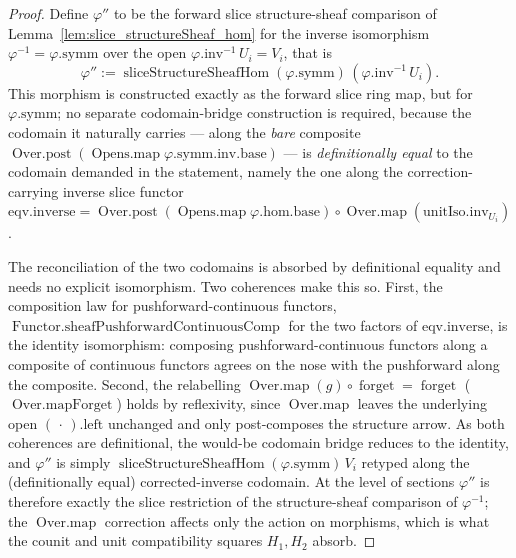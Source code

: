 \begin{proof}
  \leanok
  Define \(\varphi''\) to be the forward slice structure-sheaf comparison of
  Lemma~\ref{lem:slice_structureSheaf_hom} for the inverse isomorphism \(\varphi^{-1} = \varphi.
  \mathrm{symm}\) over the open \(\varphi.\mathrm{inv}^{-1}\,U_i = V_i\), that is
  \[
    \varphi'' := \operatorname{sliceStructureSheafHom}(\varphi.\mathrm{symm})\,(\varphi.\mathrm{inv}^{-1}\,U_i).
  \]
  This morphism is constructed exactly as the forward slice ring map, but for \(\varphi.\mathrm{symm}\);
  no separate codomain-bridge construction is required, because the codomain it naturally carries ---
  along the \emph{bare} composite \(\operatorname{Over.post}(\operatorname{Opens.map}\varphi.\mathrm{symm}.
  \mathrm{inv}.\mathrm{base})\) --- is \emph{definitionally equal} to the codomain demanded in the
  statement, namely the one along the correction-carrying inverse slice functor
  \(\mathrm{eqv}.\mathrm{inverse} = \operatorname{Over.post}(\operatorname{Opens.map}\varphi.\mathrm{hom}.
  \mathrm{base}) \circ \operatorname{Over.map}(\mathrm{unitIso}.\mathrm{inv}_{U_i})\).

  The reconciliation of the two codomains is absorbed by definitional equality and needs no explicit
  isomorphism. Two coherences make this so. First, the composition law for pushforward-continuous
  functors, \(\operatorname{Functor.sheafPushforwardContinuousComp}\) for the two factors of
  \(\mathrm{eqv}.\mathrm{inverse}\), is the identity isomorphism:
  composing pushforward-continuous functors along a composite of continuous functors agrees on the nose
  with the pushforward along the composite. Second, the relabelling
  \(\operatorname{Over.map}(g) \circ \operatorname{forget} = \operatorname{forget}\)
  (\(\operatorname{Over.mapForget}\)) holds by reflexivity, since \(\operatorname{Over.map}\) leaves
  the underlying open \((\,\cdot\,).\mathrm{left}\) unchanged and only post-composes the structure
  arrow. As both coherences are definitional, the would-be codomain bridge reduces to the identity, and
  \(\varphi''\) is simply \(\operatorname{sliceStructureSheafHom}(\varphi.\mathrm{symm})\,V_i\) retyped
  along the (definitionally equal) corrected-inverse codomain. At the level of sections \(\varphi''\) is therefore
  exactly the slice restriction of the structure-sheaf comparison of \(\varphi^{-1}\); the
  \(\operatorname{Over.map}\) correction affects only the action on morphisms, which is what the counit
  and unit compatibility squares \(H_1, H_2\) absorb.
\end{proof}

